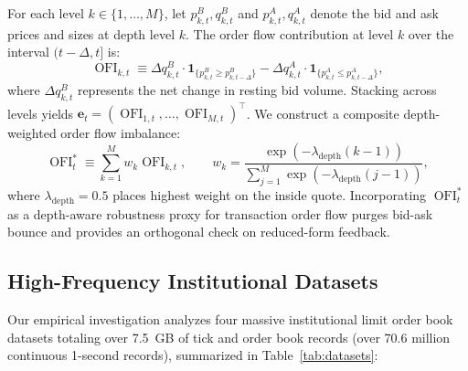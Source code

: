 \documentclass[12pt]{article}
\theoremstyle{definition}
\theoremstyle{remark}
\begin{document}
For each level $k \in \{1, \dots, M\}$, let $p_{k,t}^B, q_{k,t}^B$ and $p_{k,t}^A, q_{k,t}^A$ denote the bid and ask prices and sizes at depth level $k$. The order flow contribution at level $k$ over the interval $(t-\Delta, t]$ is:
\begin{equation}
\operatorname{OFI}_{k, t} \equiv \Delta q_{k, t}^B \cdot \mathbf{1}_{\{p_{k, t}^B \ge p_{k, t-\Delta}^B\}} - \Delta q_{k, t}^A \cdot \mathbf{1}_{\{p_{k, t}^A \le p_{k, t-\Delta}^A\}},
\label{eq:ofi_level}
\end{equation}
where $\Delta q_{k,t}^B$ represents the net change in resting bid volume. Stacking across levels yields $\mathbf{e}_t = (\operatorname{OFI}_{1,t}, \dots, \operatorname{OFI}_{M,t})^\top$. 
We construct a composite depth-weighted order flow imbalance:
\begin{equation}
\operatorname{OFI}_t^* \equiv \sum_{k=1}^M w_k \operatorname{OFI}_{k, t}, \qquad w_k = \frac{\exp(-\lambda_{\text{depth}} (k-1))}{\sum_{j=1}^M \exp(-\lambda_{\text{depth}} (j-1))},
\end{equation}
where $\lambda_{\text{depth}} = 0.5$ places highest weight on the inside quote. Incorporating $\operatorname{OFI}_t^*$ as a depth-aware robustness proxy for transaction order flow purges bid-ask bounce and provides an orthogonal check on reduced-form feedback.

\subsection{High-Frequency Institutional Datasets}
Our empirical investigation analyzes four massive institutional limit order book datasets totaling over 7.5~GB of tick and order book records (over 70.6 million continuous 1-second records), summarized in Table~\ref{tab:datasets}:
\end{document}
